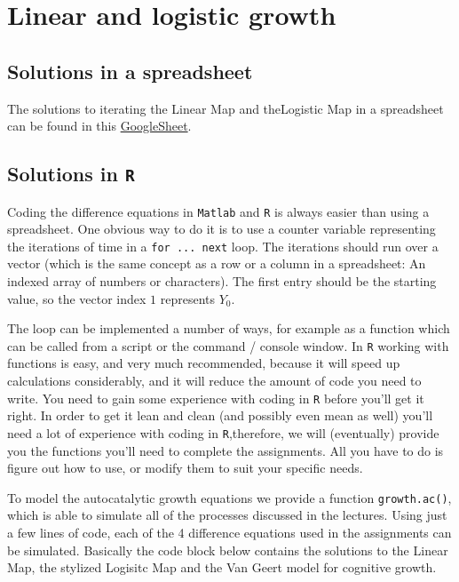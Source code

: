 \documentclass[]{book}
\let\stdsection\section
\renewcommand\section{\newpage\stdsection}
\begin{document}
\section{\texorpdfstring{\textbf{Linear and logistic
growth}}{Linear and logistic growth}}\label{linear-and-logistic-growth}

\subsection*{Solutions in a
spreadsheet}\label{solutions-in-a-spreadsheet}

The solutions to iterating the Linear Map and theLogistic Map in a
spreadsheet can be found in this
\href{https://docs.google.com/spreadsheets/d/1BL_oKoCFH3NQ3qKLBQ-WbkPg_ppSZsyDNl2nS9oPGcM/edit?usp=sharing}{GoogleSheet}.

\subsection*{\texorpdfstring{Solutions in
\texttt{R}}{Solutions in R}}\label{solutions-in-r}

Coding the difference equations in \texttt{Matlab} and \texttt{R} is
always easier than using a spreadsheet. One obvious way to do it is to
use a counter variable representing the iterations of time in a
\texttt{for\ ...\ next} loop. The iterations should run over a vector
(which is the same concept as a row or a column in a spreadsheet: An
indexed array of numbers or characters). The first entry should be the
starting value, so the vector index \(1\) represents \(Y_0\).

The loop can be implemented a number of ways, for example as a function
which can be called from a script or the command / console window. In
\texttt{R} working with functions is easy, and very much recommended,
because it will speed up calculations considerably, and it will reduce
the amount of code you need to write. You need to gain some experience
with coding in \texttt{R} before you'll get it right. In order to get it
lean and clean (and possibly even mean as well) you'll need a lot of
experience with coding in \texttt{R},therefore, we will (eventually)
provide you the functions you'll need to complete the assignments. All
you have to do is figure out how to use, or modify them to suit your
specific needs.

To model the autocatalytic growth equations we provide a function
\texttt{growth.ac()}, which is able to simulate all of the processes
discussed in the lectures. Using just a few lines of code, each of the 4
difference equations used in the assignments can be simulated. Basically
the code block below contains the solutions to the Linear Map, the
stylized Logisitc Map and the Van Geert model for cognitive growth.
\end{document}
